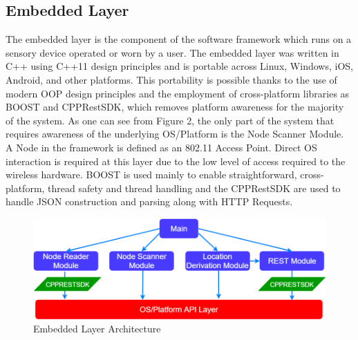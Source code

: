 \documentclass[conference]{IEEEtran}
\begin{document}
\subsection{Embedded Layer}
The embedded layer is the component of the software framework which runs on a sensory device operated or worn by a user. The embedded layer was written in C++ using C++11 design principles and is portable across Linux, Windows, iOS, Android, and other platforms. This portability is possible thanks to the use of modern OOP design principles and the employment of cross-platform libraries as BOOST and CPPRestSDK, which removes platform awareness for the majority of the system. As one can see from Figure 2, the only part of the system that requires awareness of the underlying OS/Platform is the Node Scanner Module. A Node in the framework is defined as an 802.11 Access Point. Direct OS interaction is required at this layer due to the low level of access required to the wireless hardware.
BOOST is used mainly to enable straightforward, cross-platform, thread safety and thread handling and the CPPRestSDK are used to handle JSON construction and parsing along with HTTP Requests.
\begin{figure}[H]
    \includegraphics[width=9 cm,height=3.5 cm]{Pink_Panther_Architecture.png}
    \caption{Embedded Layer Architecture}
    \end{figure}
\end{document}
